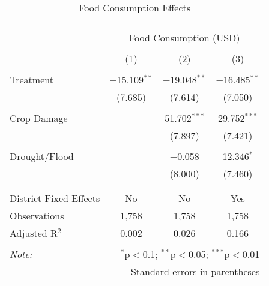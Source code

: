 
\begin{table}[!htbp] \centering 
  \caption{Food Consumption Effects} 
  \label{} 
\begin{tabular}{@{\extracolsep{5pt}}lccc} 
\\[-1.8ex]\hline 
\hline \\[-1.8ex] 
\\[-1.8ex] & \multicolumn{3}{c}{Food Consumption (USD)} \\ 
\\[-1.8ex] & (1) & (2) & (3)\\ 
\hline \\[-1.8ex] 
 Treatment & $-$15.109$^{**}$ & $-$19.048$^{**}$ & $-$16.485$^{**}$ \\ 
  & (7.685) & (7.614) & (7.050) \\ 
  & & & \\ 
 Crop Damage &  & 51.702$^{***}$ & 29.752$^{***}$ \\ 
  &  & (7.897) & (7.421) \\ 
  & & & \\ 
 Drought/Flood &  & $-$0.058 & 12.346$^{*}$ \\ 
  &  & (8.000) & (7.460) \\ 
  & & & \\ 
\hline \\[-1.8ex] 
District Fixed Effects & No & No & Yes \\ 
Observations & 1,758 & 1,758 & 1,758 \\ 
Adjusted R$^{2}$ & 0.002 & 0.026 & 0.166 \\ 
\hline 
\hline \\[-1.8ex] 
\textit{Note:}  & \multicolumn{3}{r}{$^{*}$p$<$0.1; $^{**}$p$<$0.05; $^{***}$p$<$0.01} \\ 
 & \multicolumn{3}{r}{Standard errors in parentheses} \\ 
\end{tabular} 
\end{table} 
